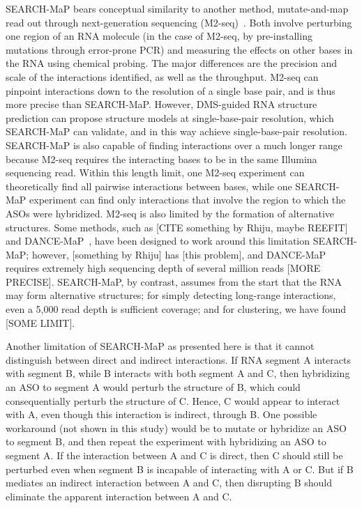 \documentclass[main.tex]{subfiles}
\begin{document}
SEARCH-MaP bears conceptual similarity to another method, mutate-and-map read out through next-generation sequencing (M2-seq)~\cite{Cheng2017}. Both involve perturbing one region of an RNA molecule (in the case of M2-seq, by pre-installing mutations through error-prone PCR) and measuring the effects on other bases in the RNA using chemical probing. The major differences are the precision and scale of the interactions identified, as well as the throughput. M2-seq can pinpoint interactions down to the resolution of a single base pair, and is thus more precise than SEARCH-MaP. However, DMS-guided RNA structure prediction can propose structure models at single-base-pair resolution, which SEARCH-MaP can validate, and in this way achieve single-base-pair resolution. SEARCH-MaP is also capable of finding interactions over a much longer range because M2-seq requires the interacting bases to be in the same Illumina sequencing read. Within this length limit, one M2-seq experiment can theoretically find all pairwise interactions between bases, while one SEARCH-MaP experiment can find only interactions that involve the region to which the ASOs were hybridized. M2-seq is also limited by the formation of alternative structures. Some methods, such as [CITE something by Rhiju, maybe REEFIT] and DANCE-MaP~\cite{Olson2022}, have been designed to work around this limitation SEARCH-MaP; however, [something by Rhiju] has [this problem], and DANCE-MaP requires extremely high sequencing depth of several million reads [MORE PRECISE]. SEARCH-MaP, by contrast, assumes from the start that the RNA may form alternative structures; for simply detecting long-range interactions, even a 5,000 read depth is sufficient coverage; and for clustering, we have found [SOME LIMIT].

Another limitation of SEARCH-MaP as presented here is that it cannot distinguish between direct and indirect interactions. If RNA segment A interacts with segment B, while B interacts with both segment A and C, then hybridizing an ASO to segment A would perturb the structure of B, which could consequentially perturb the structure of C. Hence, C would appear to interact with A, even though this interaction is indirect, through B. One possible workaround (not shown in this study) would be to mutate or hybridize an ASO to segment B, and then repeat the experiment with hybridizing an ASO to segment A. If the interaction between A and C is direct, then C should still be perturbed even when segment B is incapable of interacting with A or C. But if B mediates an indirect interaction between A and C, then disrupting B should eliminate the apparent interaction between A and C.
\end{document}
